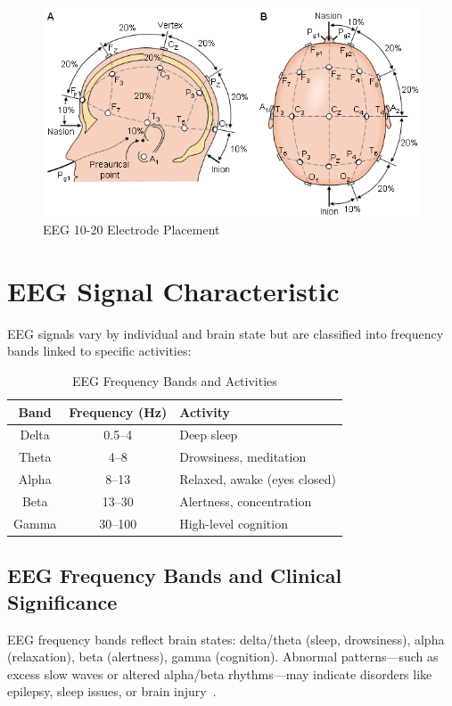 \documentclass[11pt]{article}
\begin{document}
\begin{figure}[H]
    \centering
    \includegraphics[width=.4\textwidth]{placement.png}
    \caption{EEG 10-20 Electrode Placement\cite{place}}
\end{figure}

\section*{EEG Signal Characteristic}
EEG signals vary by individual and brain state but are classified into frequency bands linked to specific activities:

\begin{table}[H]
    \centering
    \begin{tabular}{|c|c|l|}
        \hline
        \textbf{Band} & \textbf{Frequency (Hz)} & \textbf{Activity}            \\
        \hline
        Delta         & 0.5--4                  & Deep sleep                   \\
        Theta         & 4--8                    & Drowsiness, meditation       \\
        Alpha         & 8--13                   & Relaxed, awake (eyes closed) \\
        Beta          & 13--30                  & Alertness, concentration     \\
        Gamma         & 30--100                 & High-level cognition         \\
        \hline
    \end{tabular}
    \caption{EEG Frequency Bands and Activities\cite{siuly2016eeg}}
\end{table}

\subsection*{EEG Frequency Bands and Clinical Significance}
EEG frequency bands reflect brain states: delta/theta (sleep, drowsiness), alpha (relaxation), beta (alertness), gamma (cognition). Abnormal patterns—such as excess slow waves or altered alpha/beta rhythms—may indicate disorders like epilepsy, sleep issues, or brain injury~\cite{siuly2016eeg}.
\end{document}

